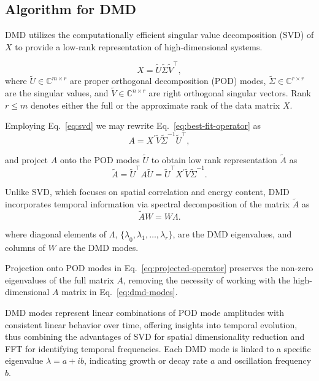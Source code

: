\subsection{Algorithm for DMD}
DMD utilizes the computationally efficient singular value decomposition (SVD) of \(X\) to provide a low-rank representation of high-dimensional systems.

\begin{equation}\label{eq:svd}
    X = \tilde{U} \tilde{\Sigma} \tilde{V}^\top,
\end{equation}
where \(\tilde{U} \in \mathbb{C}^{m \times r}\) are proper orthogonal decomposition (POD) modes, \(\tilde{\Sigma} \in \mathbb{C}^{r \times r}\) are the singular values, and \( \tilde{V} \in \mathbb{C}^{n \times r}\) are right orthogonal singular vectors. Rank \(r \leq m\) denotes either the full or the approximate rank of the data matrix \(X\).

Employing Eq.~\ref{eq:svd} we may rewrite Eq.~\ref{eq:best-fit-operator} as
\begin{equation*}
    A = X^\prime \tilde{V} \tilde{\Sigma}^{-1} \tilde{U}^\top,
\end{equation*}

and project \(A\) onto the POD modes \(\tilde{U}\) to obtain low rank representation \(\tilde{A}\) as
\begin{equation}\label{eq:projected-operator}
    \tilde{A} = \tilde{U}^\top A \tilde{U} = \tilde{U}^\top X^\prime \tilde{V} \tilde{\Sigma}^{-1}.
\end{equation}

Unlike SVD, which focuses on spatial correlation and energy content, DMD incorporates temporal information via spectral decomposition of the matrix \(\tilde{A}\) as
\begin{equation}\label{eq:dmd-modes}
    \tilde{A} W = W \Lambda.
\end{equation}

where diagonal elements of \(\Lambda \), \({\{\lambda}_0, {\lambda}_1, \ldots, {\lambda}_r\} \), are the DMD eigenvalues, and columns of \(W\) are the DMD modes.

Projection onto POD modes in Eq.~\ref{eq:projected-operator} preserves the non-zero eigenvalues of the full matrix \(A\), removing the necessity of working with the high-dimensional \(A\) matrix in Eq.~\ref{eq:dmd-modes}.

DMD modes represent linear combinations of POD mode amplitudes with consistent linear behavior over time, offering insights into temporal evolution, thus combining the advantages of SVD for spatial dimensionality reduction and FFT for identifying temporal frequencies. Each DMD mode is linked to a specific eigenvalue \(\lambda = a + ib\), indicating growth or decay rate \(a\) and oscillation frequency \(b\).

